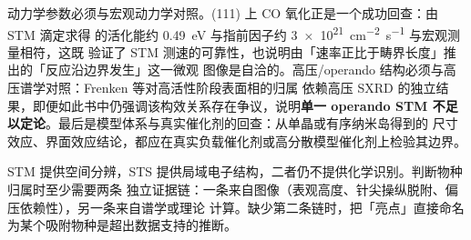 动力学参数必须与宏观动力学对照。(111) 上 CO 氧化正是一个成功回查：由 STM 滴定求得
的活化能约 \qty{0.49}{eV} 与指前因子约 \qty{3e21}{cm^{-2}.s^{-1}} 与宏观测量相符，这既
验证了 STM 测速的可靠性，也说明由「速率正比于畴界长度」推出的「反应沿边界发生」这一微观
图像是自洽的。高压/operando 结构必须与高压谱学对照：Frenken 等对高活性阶段表面相的归属
依赖高压 SXRD 的独立结果，即便如此书中仍强调该构效关系存在争议，说明\textbf{单一
operando STM 不足以定论}。最后是模型体系与真实催化剂的回查：从单晶或有序纳米岛得到的
尺寸效应、界面效应结论，都应在真实负载催化剂或高分散模型催化剂上检验其边界。

\begin{crosscheck}
STM 提供空间分辨，STS 提供局域电子结构，二者仍不提供化学识别。判断物种归属时至少需要两条
独立证据链：一条来自图像（表观高度、针尖操纵脱附、偏压依赖性），另一条来自谱学或理论
计算。缺少第二条链时，把「亮点」直接命名为某个吸附物种是超出数据支持的推断。
\end{crosscheck}
